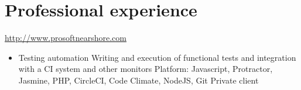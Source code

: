 \documentclass[11pt,a4paper]{moderncv}
\begin{document}
\section{Professional experience}
{
    \url{http://www.prosoftnearshore.com}
    \begin{itemize}
        \item Testing automation
            \newline{}
            Writing and execution of functional tests and integration with a CI system and other monitors
            \newline{}
            Platform: Javascript, Protractor, Jasmine, PHP, CircleCI, Code Climate, NodeJS, Git
            \newline{}
            Private client
            \newline{}
    \end{itemize}
}
\end{document}
